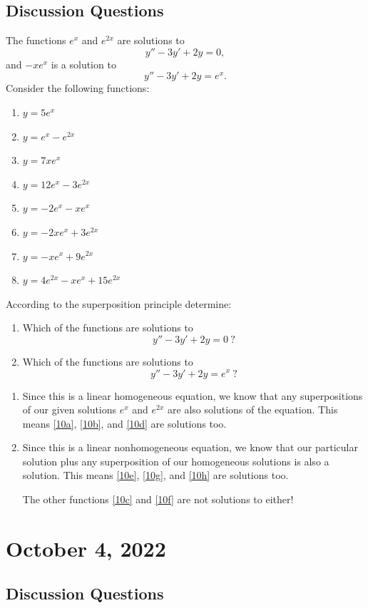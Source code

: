 \documentclass[12pt]{amsart}
\numberwithin{equation}{section}
\theoremstyle{plain} %
\newcommand{\Oct}[1]{\section{October #1, 2022}}
\theoremstyle{definition}
\theoremstyle{remark}
\begin{document}
\subsection*{Discussion Questions}
The functions $e^x$ and $e^{2x}$ are solutions to
\[ y'' - 3y' + 2y = 0,\]
and  $-xe^{x}$ is a solution to
\[ y'' - 3y' + 2y = e^{x}.\]
Consider the following functions:
\begin{multicols}{2}
\begin{enumerate}[label=(\alph*)]
\item\label{10a} $y= 5 e^x$
\item\label{10b} $y= e^x - e^{2x}$
\item\label{10c} $y= 7 xe^{x}$
\item\label{10d} $y= 12e^x -  3 e^{2x}$
\item\label{10e} $y=  -2 e^x - xe^{x}$
\item\label{10f} $y= -2 x e^x + 3 e^{2x}$
\item\label{10g} $y= - x e^x + 9 e^{2x}$
\item\label{10h} $y= 4 e^{2x} - x e^x + 15 e^{2x}$
\end{enumerate}
\end{multicols}
According to the superposition principle determine:
\begin{enumerate}
\item Which of the functions are solutions to
\[ y'' - 3y' + 2y = 0\ ?\]
\item Which of the functions are solutions to
\[ y'' - 3y' + 2y = e^x\ ?\]
\end{enumerate}
\begin{framed}
\begin{enumerate}
\item Since this is a linear homogeneous equation, we know that any superpositions of our given solutions $e^x$ and $e^{2x}$ are also solutions of the equation. This means \ref{10a}, \ref{10b}, and \ref{10d} are solutions too.
\item Since this is a linear nonhomogeneous equation, we know that our particular solution plus any superposition of our homogeneous solutions is also a solution. This means \ref{10e}, \ref{10g}, and \ref{10h} are solutions too.

The other functions \ref{10c} and \ref{10f} are not solutions to either!
\end{enumerate}
\end{framed}


\Oct{4}


	\subsection*{Discussion Questions}
	
\end{document}

